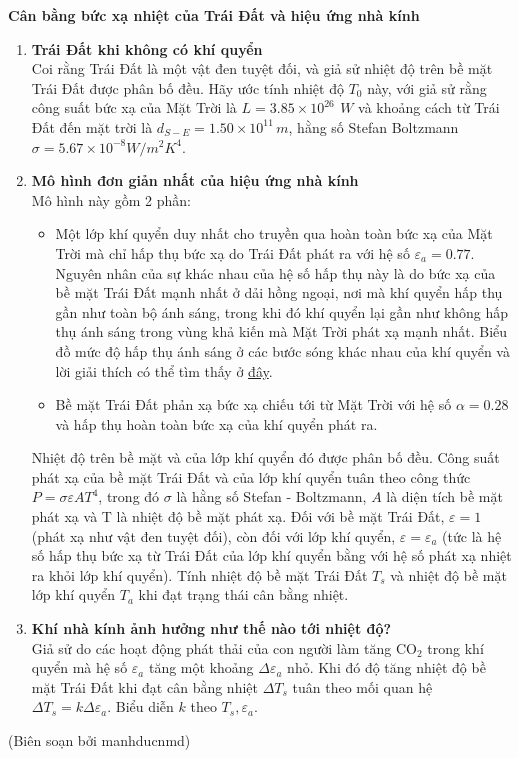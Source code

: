\textbf{Cân bằng bức xạ nhiệt của Trái Đất và hiệu ứng nhà kính} 
        \begin{enumerate}[label=\textbf{\arabic*,}]\itemsep0em 
        \item \textbf{Trái Đất khi không có khí quyển} \\
        Coi rằng Trái Đất là một vật đen tuyệt đối, và giả sử nhiệt độ trên bề mặt Trái Đất được phân bố đều. Hãy ước tính nhiệt độ \(T_{0}\) này, với giả sử rằng công suất bức xạ của Mặt Trời là \(L = 3.85 \times 10^{26}\ \, \si{W}\) và khoảng cách từ Trái Đất đến mặt trời là \(d_{S-E} = 1.50 \times 10^{11} \, \si{m} \), hằng số Stefan Boltzmann \( \sigma = 5.67 \times 10^{-8} \si{W/m^2K^4}\). 
        \item \textbf{Mô hình đơn giản nhất của hiệu ứng nhà kính} \\
        Mô hình này gồm 2 phần:
        \begin{itemize}
            \item Một lớp khí quyển duy nhất cho truyền qua hoàn toàn bức xạ của Mặt Trời mà chỉ hấp thụ bức xạ do Trái Đất phát ra với hệ số \(\varepsilon_{a} = 0.77\). Nguyên nhân của sự khác nhau của hệ số hấp thụ này là do bức xạ của bề mặt Trái Đất mạnh nhất ở dải hồng ngoại, nơi mà khí quyển hấp thụ gần như toàn bộ ánh sáng, trong khi đó khí quyển lại gần như không hấp thụ ánh sáng trong vùng khả kiến mà Mặt Trời phát xạ mạnh nhất. Biểu đồ mức độ hấp thụ ánh sáng ở các bước sóng khác nhau của khí quyển và lời giải thích có thể tìm thấy ở \href{https://www.aos.wisc.edu/~aos121br/radn/radn/sld009.htm#}{đây}.
            \item Bề mặt Trái Đất phản xạ bức xạ chiếu tới từ Mặt Trời với hệ số \(\alpha = 0.28 \) và hấp thụ hoàn toàn bức xạ của khí quyển phát ra.
        \end{itemize}
        Nhiệt độ trên bề mặt và của lớp khí quyển đó được phân bố đều. Công suất phát xạ của bề mặt Trái Đất và của lớp khí quyển tuân theo công thức \(P = \sigma \varepsilon A T^{4}\), trong đó \(\sigma\)  là hằng số Stefan - Boltzmann, \(A\) là diện tích bề mặt phát xạ và T là nhiệt độ bề mặt phát xạ. Đối với bề mặt Trái Đất, \(\varepsilon = 1\) (phát xạ như vật đen tuyệt đối), còn đối với lớp khí quyển, \(\varepsilon = \varepsilon_{a}\) (tức là hệ số hấp thụ bức xạ từ Trái Đất của lớp khí quyển bằng với hệ số phát xạ nhiệt ra khỏi lớp khí quyển). Tính nhiệt độ bề mặt Trái Đất \(T_s\) và nhiệt độ bề mặt lớp khí quyển \(T_a\) khi đạt trạng thái cân bằng nhiệt. 
        \item \textbf{Khí nhà kính ảnh hưởng như thế nào tới nhiệt độ?} \\
        Giả sử do các hoạt động phát thải của con người làm tăng \(\mathrm{CO}_2\) trong khí quyển mà hệ số \(\varepsilon_{a}\) tăng một khoảng \(\Delta \varepsilon_{a}\) nhỏ. Khi đó độ tăng nhiệt độ bề mặt Trái Đất khi đạt cân bằng nhiệt \(\Delta T_{s}\) tuân theo mối quan hệ \(\Delta T_{s} = k \Delta \varepsilon_{a}\). Biểu diễn \(k\) theo \(T_{s}, \varepsilon_{a}\).
        \end{enumerate}

\begin{flushright}
    (Biên soạn bởi manhducnmd)
\end{flushright}